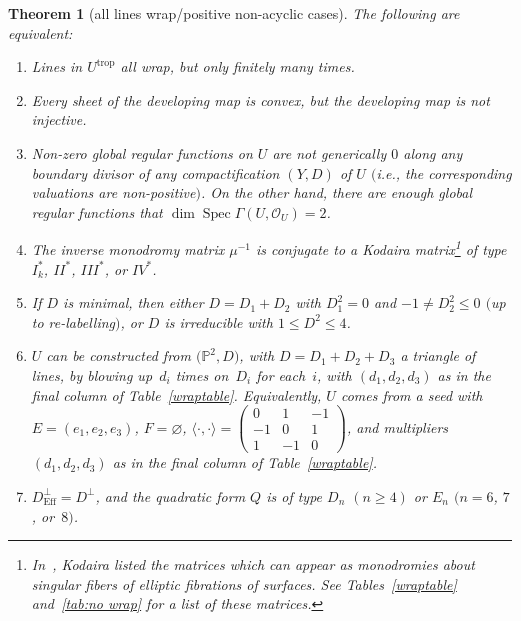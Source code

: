 \documentclass[11pt]{article}
\numberwithin{equation}{section}
\numberwithin{figure}{section}
\numberwithin{table}{section}
\DeclareMathOperator{\Spec}{Spec}
\DeclareMathOperator{\trop}{trop}
\DeclareMathOperator{\Eff}{Eff}
\let\bb=\mathbb
\let\s=\mathcal
\newtheorem{thm}{Theorem}[section]
\theoremstyle{definition}
\begin{document}
\begin{thm}[all lines wrap/positive non-acyclic cases]\label{all-wrap}
The following are equivalent:
\begin{enumerate}\itemsep=0pt	
 \item[$1.$] {Lines} in $U^{\trop}$ all wrap, but only finitely many times. %
 \item[$2.$] Every sheet of the {developing map} is convex, but the developing map is not injective. %
 \item[$3.$] Non-zero global regular {functions} on $U$ are not generically $0$ along any boundary divisor of any compactification $(Y,D)$ of $U$ $($i.e., the corresponding valuations are non-positive$)$. On the other hand, there are enough global regular functions that $\dim \Spec \Gamma(U,\s{O}_U)=2$.%
 \item[$4.$] The inverse {monodromy matrix} $\mu^{-1}$ is conjugate to a Kodaira matrix\footnote{In~\cite{Kod}, Kodaira listed the matrices which can appear as monodromies about singular fibers of elliptic fibrations of surfaces. See Tables~\ref{wraptable} and~\ref{tab:no wrap} for a list of these matrices.} of type $I_k^*$, $II^*$, $III^*$, or $IV^*$. %
 \item[$5.$] If $D$ is minimal, then either $D=D_1+D_2$ with $D_1^2 = 0$ and $-1\neq D_2^2 \leq 0$ $($up to re-labelling$)$, or $D$ is irreducible with $1\leq D^2 \leq 4$. 	%
 \item[$6.$] $U$ can be constructed from $\big(\bb{P}^2,D\big)$, with $D=D_1+D_2+D_3$ a triangle of lines, by blowing up~$d_i$ times on~$D_i$ for each~$i$, with $(d_1,d_2,d_3)$ as in the final column of Table~{\rm \ref{wraptable}}. Equivalently, $U$ comes from a seed with $E=(e_1,e_2,e_3)$, $F=\varnothing$, $\langle \cdot , \cdot \rangle = 	\left(\begin{smallmatrix}
		0 &1 &-1 \\
	 -1 &0 &1 \\
	 1 &-1 &0
		\end{smallmatrix}\right)$, and multipliers $(d_1,d_2,d_3)$ as in the final column of Table~{\rm \ref{wraptable}}.
\item[$7.$] $D^{\perp}_{\Eff}=D^{\perp}$, and the {quadratic form} $Q$ is of type $D_n$ $(n\geq 4)$ or $E_n$ $(n=6$, $7$, or~$8)$. %
\end{enumerate}
\end{thm}
\end{document}
